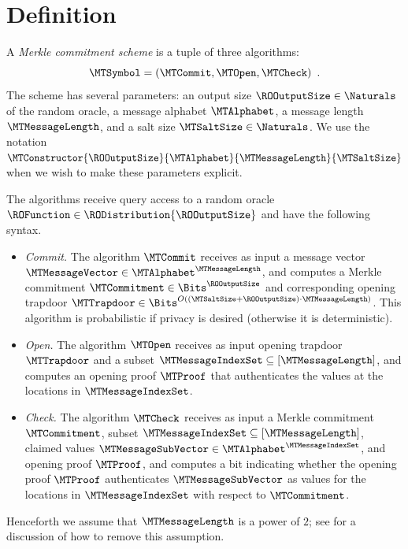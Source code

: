 \section{Definition}
\label{section:merkle-commitment-definition}

A \emph{Merkle commitment scheme} is a tuple of three algorithms:
\begin{equation*}
\MTSymbol = (\MTCommit,\MTOpen,\MTCheck)
\enspace.
\end{equation*}
The scheme has several parameters: an output size $\ROOutputSize \in \Naturals$ of the random oracle, a message alphabet $\MTAlphabet$, a message length $\MTMessageLength$, and a salt size $\MTSaltSize \in \Naturals$. We use the notation $\MTConstructor{\ROOutputSize}{\MTAlphabet}{\MTMessageLength}{\MTSaltSize}$ when we wish to make these parameters explicit.

The algorithms receive query access to a random oracle $\ROFunction \in \RODistribution{\ROOutputSize}$ and have the following syntax.
\begin{itemize}
  \item \emph{Commit.}
  The algorithm $\MTCommit$ receives as input a message vector $\MTMessageVector \in \MTAlphabet^{\MTMessageLength}$, and computes a Merkle commitment $\MTCommitment \in \Bits^{\ROOutputSize}$ and corresponding opening trapdoor $\MTTrapdoor \in \Bits^{O((\MTSaltSize + \ROOutputSize) \cdot \MTMessageLength)}$. This algorithm is probabilistic if privacy is desired (otherwise it is deterministic).
  \item \emph{Open.}
  The algorithm $\MTOpen$ receives as input opening trapdoor $\MTTrapdoor$ and a subset $\MTMessageIndexSet \subseteq [\MTMessageLength]$, and computes an opening proof $\MTProof$ that authenticates the values at the locations in $\MTMessageIndexSet$.
  \item \emph{Check.}
  The algorithm $\MTCheck$ receives as input a Merkle commitment $\MTCommitment$, subset $\MTMessageIndexSet \subseteq [\MTMessageLength]$, claimed values $\MTMessageSubVector \in \MTAlphabet^{\MTMessageIndexSet}$, and opening proof $\MTProof$, and computes a bit indicating whether the opening proof $\MTProof$ authenticates $\MTMessageSubVector$ as values for the locations in $\MTMessageIndexSet$ with respect to $\MTCommitment$.
\end{itemize}
Henceforth we assume that $\MTMessageLength$ is a power of $2$; see  for a discussion of how to remove this assumption.

